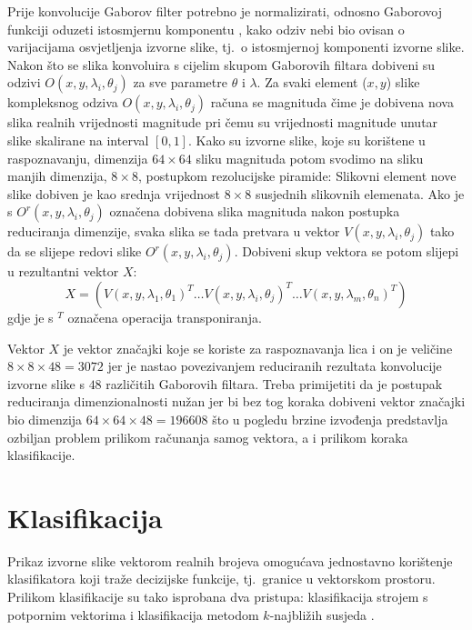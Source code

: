 \documentclass{ru}
\begin{document}
Prije konvolucije Gaborov filter potrebno je normalizirati, odnosno Gaborovoj
funkciji oduzeti istosmjernu komponentu , kako odziv nebi bio
ovisan o varijacijama osvjetljenja izvorne slike, tj.~o istosmjernoj komponenti
izvorne slike. Nakon što se slika konvoluira s cijelim skupom Gaborovih filtara
dobiveni su odzivi $O(x,y,\lambda_i, \theta_j)$ za sve parametre $\theta$ i
$\lambda$. Za svaki element ($x,y$) slike kompleksnog odziva $O(x,y,\lambda_i,
\theta_j)$ računa se magnituda čime je dobivena nova slika realnih vrijednosti
magnitude pri čemu su vrijednosti magnitude unutar slike skalirane na interval
$[0, 1]$. Kako su izvorne slike, koje su korištene u raspoznavanju, dimenzija
$64\times64$ sliku magnituda potom svodimo na sliku manjih dimenzija, $8\times8$,
postupkom rezolucijske piramide: Slikovni element nove slike dobiven je
kao srednja vrijednost $8\times8$ susjednih slikovnih elemenata. Ako je s
$O^{r}(x,y,\lambda_i, \theta_j)$ označena dobivena slika magnituda nakon postupka
reduciranja dimenzije, svaka slika se tada pretvara u vektor $V(x,y,\lambda_i,
\theta_j)$ tako da se slijepe  redovi slike
$O^{r}(x,y,\lambda_i, \theta_j)$. Dobiveni skup vektora se potom slijepi u
rezultantni vektor $X$:
\begin{equation}
 X = \left ( V(x,y,\lambda_1, \theta_1)^T \ldots
V(x,y,\lambda_i, \theta_j)^T \ldots V(x,y,\lambda_m, \theta_n)^T \right )
\end{equation}
gdje je s $^T$ označena operacija transponiranja.

Vektor $X$ je vektor značajki koje se koriste za raspoznavanja lica i on
je veličine $8\times8\times48 = 3072$  jer je nastao povezivanjem reduciranih
rezultata konvolucije izvorne slike s $48$ različitih Gaborovih filtara. Treba
primijetiti da je postupak reduciranja dimenzionalnosti nužan jer bi bez tog koraka
dobiveni vektor značajki bio dimenzija $64\times64\times48 = 196608$ što u
pogledu brzine izvođenja predstavlja ozbiljan problem prilikom računanja samog
vektora, a i prilikom koraka klasifikacije.




\chapter{Klasifikacija}

Prikaz izvorne slike vektorom realnih brojeva omogućava jednostavno korištenje
klasifikatora koji traže decizijske funkcije, tj.~granice u vektorskom prostoru.
Prilikom klasifikacije su tako isprobana dva pristupa: klasifikacija strojem s
potpornim vektorima  i klasifikacija metodom
$k$-najbližih susjeda .
\end{document}
